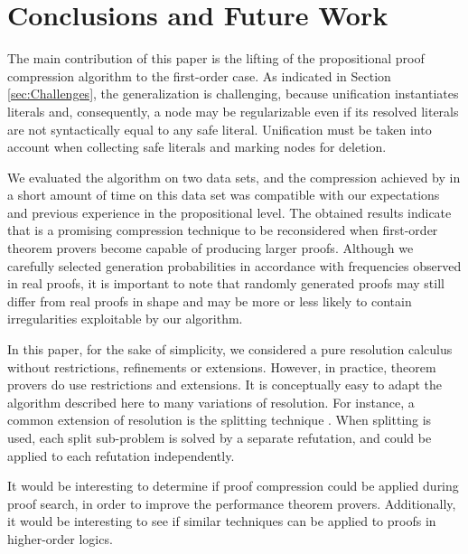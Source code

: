 \vspace{-0.25cm}
\section{Conclusions and Future Work}\label{sec:conclusion}

The main contribution of this paper is the lifting of the propositional proof compression algorithm {\RPI} to the first-order case. As indicated in Section \ref{sec:Challenges}, the generalization is challenging, because unification instantiates literals and, consequently, a node may be regularizable even if its resolved literals are not syntactically equal to any safe literal. Unification must be taken into account when collecting safe literals and marking nodes for deletion.



We evaluated the algorithm on two data sets, and
the compression achieved by {\FORPI} in a short amount of time on this data set was compatible with our expectations and previous experience in the propositional level. 
The obtained results indicate that {\FORPI} is a promising compression technique to be reconsidered when first-order theorem provers become capable of producing larger proofs. Although we carefully selected generation probabilities in accordance with frequencies observed in real proofs, it is important to note that randomly generated proofs may still differ from real proofs in shape and may be more or less likely to contain irregularities exploitable by our algorithm. 


In this paper, for the sake of simplicity, we considered a pure resolution calculus without restrictions, refinements or extensions. However, in practice, theorem provers do use restrictions and extensions. It is conceptually easy to adapt the algorithm described here to many variations of resolution. 
For instance, a common extension of resolution is the splitting technique \cite{WeidenbachSplitting}. When splitting is used, each split sub-problem is solved by a separate refutation, and {\FORPI} could be applied to each refutation independently. 

It would be interesting to determine if proof compression could be applied during proof search, in order to improve the performance theorem provers. Additionally, it would be interesting to see if similar techniques can be applied to proofs in higher-order logics.




